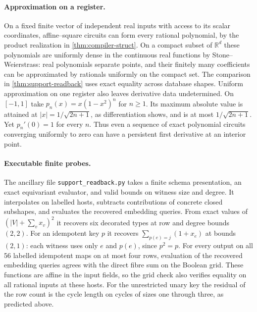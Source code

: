 \documentclass[11pt,a4paper]{article}
\theoremstyle{definition}
\theoremstyle{remark}\newaliascnt{remark}{theorem}
\numberwithin{equation}{section}
\begin{document}
\paragraph{Approximation on a register.}
On a fixed finite vector of independent real inputs with access to its scalar coordinates, affine--square circuits can form every rational polynomial, by the product realization in \cref{thm:compiler-struct}. On a compact subset of $\mathbb R^d$ these polynomials are uniformly dense in the continuous real functions by Stone--Weierstrass: real polynomials separate points, and their finitely many coefficients can be approximated by rationals uniformly on the compact set. The comparison in \cref{thm:support-readback} uses exact equality across database shapes. Uniform approximation on one register also leaves derivative data undetermined. On $[-1,1]$ take $p_n(x)=x(1-x^2)^n$ for $n\ge1$. Its maximum absolute value is attained at $|x|=1/\sqrt{2n+1}$, as differentiation shows, and is at most $1/\sqrt{2n+1}$. Yet $p_n'(0)=1$ for every $n$. Thus even a sequence of exact polynomial circuits converging uniformly to zero can have a persistent first derivative at an interior point.

\paragraph{Executable finite probes.}
The ancillary file \texttt{support\_readback.py} takes a finite schema presentation, an exact equivariant evaluator, and valid bounds on witness size and degree. It interpolates on labelled hosts, subtracts contributions of concrete closed subshapes, and evaluates the recovered embedding queries. From exact values of $(|V|+\sum_v x_v)^2$ it recovers six decorated types at row and degree bounds $(2,2)$. For an idempotent key $p$ it recovers $\sum_{p(e)=j}(1+x_e)$ at bounds $(2,1)$: each witness uses only $e$ and $p(e)$, since $p^2=p$. For every output on all 56 labelled idempotent maps on at most four rows, evaluation of the recovered embedding queries agrees with the direct fibre sum on the Boolean grid. These functions are affine in the input fields, so the grid check also verifies equality on all rational inputs at these hosts. For the unrestricted unary key the residual of the row count is the cycle length on cycles of sizes one through three, as predicted above.
\end{document}
